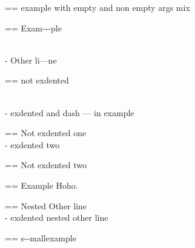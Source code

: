 \documentclass{book}
\makeatletter
\newenvironment{Texinfopreformatted}{%
  \par\GNUTobeylines\obeyspaces\frenchspacing\parskip=\z@\parindent=\z@}{}
{\catcode`\^^M=13 \gdef\GNUTobeylines{\catcode`\^^M=13 \def^^M{\null\par}}}
\newenvironment{Texinfoindented}{\begin{list}{}{}\item\relax}{\end{list}}
\renewcommand{\_}{\Texinfounderscore\discretionary{}{}{}}
\makeatother
\begin{document}
\begin{Texinfoindented}
\begin{Texinfopreformatted}%
\ttfamily example with empty and non empty args mix
\end{Texinfopreformatted}
\end{Texinfoindented}

\begin{Texinfoindented}
\begin{Texinfopreformatted}%
\ttfamily Exam{-}{-}{-}ple

\end{Texinfopreformatted}
\leavevmode{}\\
\hbox{\kern -\leftmargin}%
Other li---ne
\\
\begin{Texinfopreformatted}%
\ttfamily not exdented
\end{Texinfopreformatted}
\end{Texinfoindented}

\begin{Texinfoindented}
\leavevmode{}\\
\hbox{\kern -\leftmargin}%
exdented  and dash --- in example
\\
\begin{Texinfopreformatted}%
\ttfamily Not exdented one
\end{Texinfopreformatted}
\leavevmode{}\\
\hbox{\kern -\leftmargin}%
exdented two
\\
\begin{Texinfopreformatted}%
\ttfamily Not exdented two
\end{Texinfopreformatted}
\end{Texinfoindented}

\begin{Texinfoindented}
\begin{Texinfopreformatted}%
\ttfamily Example   Hoho.
\end{Texinfopreformatted}
\begin{Texinfoindented}
\begin{Texinfopreformatted}%
\ttfamily Nested Other line
\end{Texinfopreformatted}
\leavevmode{}\\
\hbox{\kern -\leftmargin}%
exdented nested other line
\\
\end{Texinfoindented}
\end{Texinfoindented}

\begin{Texinfopreformatted}%
\ttfamily \footnotesize s{-}{-}mallexample
\end{Texinfopreformatted}
\end{document}
